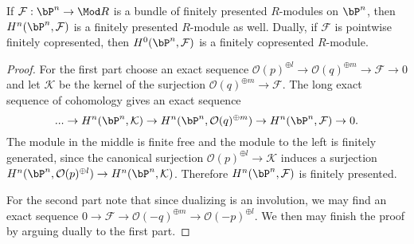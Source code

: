 \begin{corollary}
  If $\mathcal F : \bP^n \to \Mod R$ is a bundle of finitely presented $R$-modules on $\bP^n$, then $H^n(\bP^n, \mathcal F)$ is a finitely presented $R$-module as well.
  Dually, if $\mathcal F$ is pointwise finitely copresented, then $H^0(\bP^n, \mathcal F)$ is a finitely copresented $R$-module.
\end{corollary}

\begin{proof}
  For the first part choose an exact sequence $\mathcal O(p)^{\oplus l}\to \mathcal O(q)^{\oplus m}\to \mathcal F\to 0$ and let $\mathcal K$ be the kernel of the surjection $\mathcal O(q)^{\oplus m}\to \mathcal F$.
  The long exact sequence of cohomology gives an exact sequence
  \[
    ... \to H^n(\bP^n,\mathcal K) \to H^n(\bP^n, \mathcal O(q)^{\oplus m}) \to H^n(\bP^n,\mathcal F) \to 0.
  \]
  The module in the middle is finite free and the module to the left is finitely generated,  since the canonical surjection $\mathcal O(p)^{\oplus l} \to \mathcal K$ induces a surjection $H^n(\bP^n, \mathcal O(p)^{\oplus l}) \to H^n(\bP^n, \mathcal K)$.
  Therefore $H^n(\bP^n, \mathcal F)$ is finitely presented.

  For the second part note that since dualizing is an involution, we may find an exact sequence $0 \to \mathcal F \to \mathcal O(-q)^{\oplus m} \to \mathcal O(-p)^{\oplus l}$. We then may finish the proof by arguing dually to the first part.
\end{proof}
